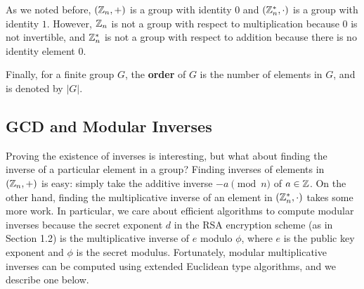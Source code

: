 As we noted before, $(\mathbb{Z}_n, +)$ is a group with identity $0$ and $(\mathbb{Z}_n^*, \cdot)$ is a group 
with identity $1$. However, $\mathbb{Z}_n$ is not a group with respect to multiplication 
because $0$ is not invertible, and 
$\mathbb{Z}_n^*$ is not a group with respect to addition because there is no identity element $0$. 

Finally, for a finite group $G$, the {\bf order} of $G$ is the number of elements in 
$G$, and is denoted by $|G|$. 

\subsection{GCD and Modular Inverses}
Proving the existence of inverses is interesting, but what about finding the inverse of a particular
element in a group? Finding inverses of elements in $(\mathbb{Z}_n, +)$ is easy: simply take the 
additive inverse $-a \pmod n$ of $a \in \mathbb{Z}$. On the other hand, finding the multiplicative 
inverse of an element in $(\mathbb{Z}_n^*, \cdot)$ takes some more work. In particular, we care about 
efficient algorithms to compute modular inverses because the secret exponent $d$ in the RSA 
encryption scheme (as in Section 1.2) is the multiplicative inverse of $e$ modulo $\phi$, where 
$e$ is the public key exponent and $\phi$ is the secret modulus. Fortunately, modular multiplicative
inverses can be computed using extended Euclidean type algorithms, and we describe one below. 

